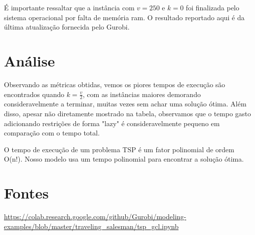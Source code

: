 \documentclass[11pt]{article}
\theoremstyle{definition}
\theoremstyle{definition}
\theoremstyle{remark}
\theoremstyle{remark}
\theoremstyle{remark}
\theoremstyle{remark}
\theoremstyle{definition}
\begin{document}
É importante ressaltar que a instância com \(v=250\) e \(k=0\) foi finalizada pelo sistema operacional por falta de memória ram. O resultado reportado aqui é da última atualização fornecida pelo Gurobi.

\section*{Análise}
\label{sec:org7143c1c}
Observando as métricas obtidas, vemos os piores tempos de execução são encontrados quando \(k = \frac{v}{2}\), com as instâncias maiores demorando consideravelmente a terminar, muitas vezes sem achar uma solução ótima. Além disso, apesar não diretamente mostrado na tabela, observamos que o tempo gasto adicionando restrições de forma "lazy" é consideravelmente pequeno em comparação com o tempo total.

O tempo de execução de um problema TSP é um fator polinomial de ordem O(n!). Nosso modelo usa um tempo polinomial para encontrar a solução ótima.
\section*{Fontes}
\label{sec:org013517e}
\url{https://colab.research.google.com/github/Gurobi/modeling-examples/blob/master/traveling\_salesman/tsp\_gcl.ipynb}
\end{document}
